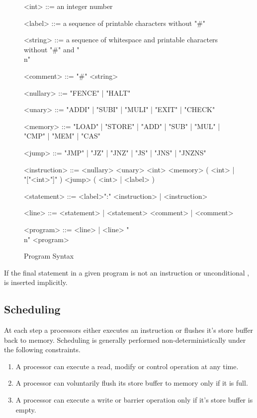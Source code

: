 \begin{figure}[!h]
\begin{grammar}
\small

<int> ::= an integer number

<label> ::= a sequence of printable characters without "#"

<string> ::= a sequence of whitespace and printable characters without "#" and "\\n"

<comment> ::= "#" <string>

<nullary> ::= "FENCE" | "HALT"

<unary> ::= "ADDI" | "SUBI" | "MULI" | "EXIT" | "CHECK"

<memory> ::= "LOAD" | "STORE" | "ADD" | "SUB" | "MUL" | "CMP" | "MEM" | "CAS"

<jump> ::= "JMP" | "JZ" | "JNZ" | "JS" | "JNS" | "JNZNS"

<instruction> ::= <nullary>
\alt <unary> <int>
\alt <memory> ( <int> | "["<int>"]" )
\alt <jump> ( <int> | <label> )

<statement> ::= <label>":" <instruction> | <instruction>

<line> ::= <statement> | <statement> <comment> | <comment>

<program> ::= <line> | <line> "\\n" <program>
\end{grammar}
\caption{Program Syntax}
\label{fig:syntax:program}
\end{figure}

If the final statement in a given program is not an  instruction or unconditional ,   is inserted implicitly.

\subsection{Scheduling}

At each step a processors either executes an instruction or flushes it's store buffer back to memory.
Scheduling is generally performed non-deterministically under the following constraints.

\begin{enumerate}
  \item A processor can execute a read, modify or control operation at any time.
  \item A processor can voluntarily flush its store buffer to memory only if it is full.
  \item A processor can execute a write or barrier operation only if it's store buffer is empty.
\end{enumerate}

